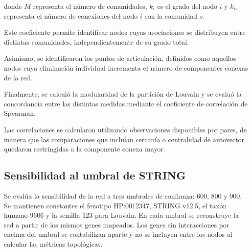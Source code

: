 donde $M$ representa el número de comunidades,
$k_i$ es el grado del nodo $i$ y $k_{is}$
representa el número de conexiones del nodo
$i$ con la comunidad $s$.

Este coeficiente permite identificar nodos cuyas
asociaciones se distribuyen entre distintas
comunidades, independientemente de su grado total.

Asimismo, se identificaron los puntos de
articulación, definidos como aquellos nodos
cuya eliminación individual incrementa el
número de componentes conexas de la red.

Finalmente, se calculó la modularidad de la
partición de Louvain y se evaluó la concordancia
entre las distintas medidas mediante el
coeficiente de correlación de Spearman.

Las correlaciones se calcularon utilizando
observaciones disponibles por pares, de manera
que las comparaciones que incluían cercanía o
centralidad de autovector quedaron restringidas
a la componente conexa mayor.

\subsection{Sensibilidad al umbral de STRING}

Se evalúa la sensibilidad de la red a tres umbrales de confianza: 600, 800 y 900. Se mantienen constantes el fenotipo HP:0012347, STRING v12.5, el taxón humano 9606 y la semilla 123 para Louvain. En cada umbral se reconstruye la red a partir de los mismos genes mapeados. Los genes sin interacciones por encima del umbral se contabilizan aparte y no se incluyen entre los nodos al calcular las métricas topológicas.
